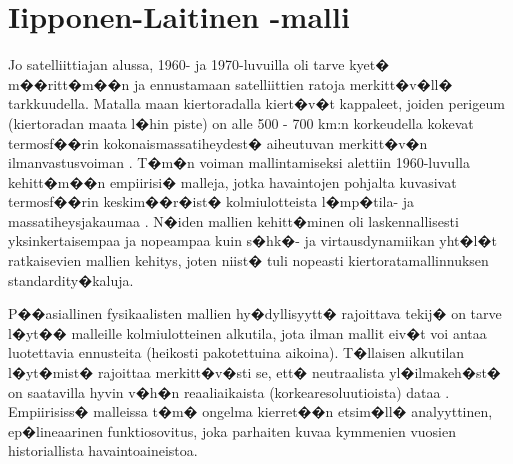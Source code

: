 \documentclass[12pt,a4paper,finnish,margin=2in]{article}
\begin{document}
\section{Iipponen-Laitinen -malli}

Jo satelliittiajan alussa, 1960- ja 1970-luvuilla oli tarve kyet� m��ritt�m��n ja ennustamaan satelliittien ratoja merkitt�v�ll� tarkkuudella. Matalla maan kiertoradalla kiert�v�t kappaleet, joiden perigeum (kiertoradan maata l�hin piste) on alle 500 - 700 km:n korkeudella kokevat termosf��rin kokonaismassatiheydest� aiheutuvan merkitt�v�n ilmanvastusvoiman \citep{king_hele_1987}. T�m�n voiman mallintamiseksi alettiin 1960-luvulla kehitt�m��n empiirisi� malleja, jotka havaintojen pohjalta kuvasivat termosf��rin keskim��r�ist� kolmiulotteista l�mp�tila- ja massatiheysjakaumaa \citep{jacchia_1965,hedin_1974}. N�iden mallien kehitt�minen oli laskennallisesti yksinkertaisempaa ja nopeampaa kuin s�hk�- ja virtausdynamiikan yht�l�t ratkaisevien mallien kehitys, joten niist� tuli nopeasti kiertoratamallinnuksen standardity�kaluja.

P��asiallinen fysikaalisten mallien hy�dyllisyytt� rajoittava tekij� on tarve l�yt�� malleille kolmiulotteinen alkutila, jota ilman mallit eiv�t voi antaa luotettavia ennusteita (heikosti pakotettuina aikoina). T�llaisen alkutilan l�yt�mist� rajoittaa merkitt�v�sti se, ett� neutraalista yl�ilmakeh�st� on saatavilla hyvin v�h�n reaaliaikaista (korkearesoluutioista) dataa \citep{emmert_2015}. Empiirisiss� malleissa t�m� ongelma kierret��n etsim�ll� analyyttinen, ep�lineaarinen funktiosovitus, joka parhaiten kuvaa kymmenien vuosien historiallista havaintoaineistoa. 
\end{document}
